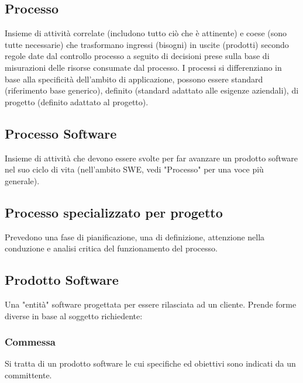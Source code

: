 	\subsection{Processo}	
	\label{sec:processi}
	Insieme di attività correlate (includono tutto ciò che è attinente) e coese (sono tutte necessarie) che trasformano ingressi (bisogni) in uscite (prodotti) secondo regole date dal controllo processo a seguito di decisioni prese sulla base di misurazioni delle risorse consumate dal processo.
	I processi si differenziano in base alla specificità dell'ambito di applicazione, possono essere standard (riferimento base generico), definito (standard adattato alle esigenze aziendali), di progetto (definito adattato al progetto).
	
	\subsection{Processo Software}
	\label{sec:processisoftware}
Insieme di attività che devono essere svolte per far avanzare un prodotto software nel suo ciclo di vita (nell'ambito SWE, vedi "Processo" per una voce più generale).

	\subsection{Processo specializzato per progetto}
	\label{sec:processispecializzati}
	Prevedono una fase di pianificazione, una di definizione, attenzione nella conduzione e analisi critica del funzionamento del processo.
	
	\subsection{Prodotto Software}
	\label{sec:prodottosoftware}
	Una "entità" software progettata per essere rilasciata ad un cliente.
	Prende forme diverse in base al soggetto richiedente:
		
		\subsubsection{Commessa}
		Si tratta di un prodotto software le cui specifiche ed obiettivi sono indicati da un committente.
	
